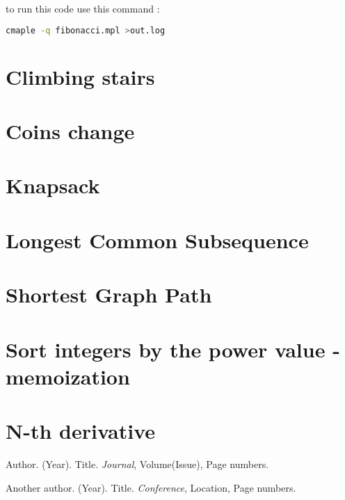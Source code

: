 \documentclass{article}
\begin{document}
to run this code use this command :
\begin{lstlisting}[language=bash]
cmaple -q fibonacci.mpl >out.log
\end{lstlisting}


\section{Climbing stairs}

\section{Coins change}

\section{Knapsack}

\section{Longest Common Subsequence}

\section{Shortest Graph Path}

\section{Sort integers by the power value - memoization}

\section{N-th derivative}

\begin{thebibliography}{9}
Author. (Year). Title. \textit{Journal}, Volume(Issue), Page numbers.

Another author. (Year). Title. \textit{Conference}, Location, Page numbers.

\end{thebibliography}
\end{document}
